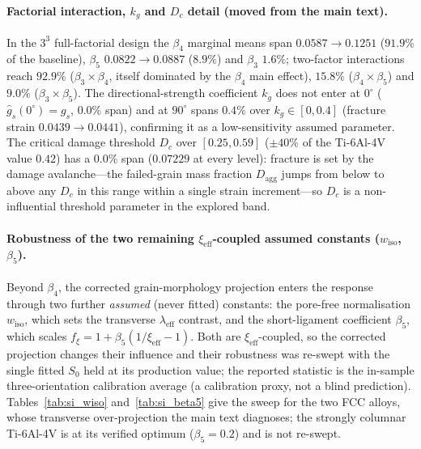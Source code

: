 \documentclass[12pt,a4paper,twocolumn]{article}
\providecommand{\ang}[1]{\ensuremath{#1^{\circ}}}
\begin{document}
\paragraph{Factorial interaction, $k_g$ and $D_c$ detail (moved from the main text).}
In the $3^3$ full-factorial design the $\beta_4$ marginal means span $0.0587\to0.1251$ ($91.9\%$ of the baseline),
$\beta_5$ $0.0822\to0.0887$ ($8.9\%$) and $\beta_3$ $1.6\%$; two-factor interactions reach $92.9\%$
($\beta_3\times\beta_4$, itself dominated by the $\beta_4$ main effect), $15.8\%$ ($\beta_4\times\beta_5$) and $9.0\%$
($\beta_3\times\beta_5$). The directional-strength coefficient $k_g$ does not enter at $\ang{0}$
($\hat g_s(0^\circ)=g_s$, $0.0\%$ span) and at $\ang{90}$ spans $0.4\%$ over $k_g\in[0,0.4]$ (fracture strain
$0.0439\to0.0441$), confirming it as a low-sensitivity assumed parameter. The critical damage threshold $D_c$ over
$[0.25,0.59]$ ($\pm40\%$ of the Ti-6Al-4V value $0.42$) has a $0.0\%$ span ($0.07229$ at every level): fracture is set
by the damage avalanche---the failed-grain mass fraction $D_{\mathrm{agg}}$ jumps from below to above any $D_c$ in this
range within a single strain increment---so $D_c$ is a non-influential threshold parameter in the explored band.

\paragraph{Robustness of the two remaining $\xi_{\mathrm{eff}}$-coupled assumed constants ($w_{\mathrm{iso}}$, $\beta_5$).}
Beyond $\beta_4$, the corrected grain-morphology projection enters the response through two further \emph{assumed} (never fitted) constants: the pore-free normalisation $w_{\mathrm{iso}}$, which sets the transverse $\lambda_{\mathrm{eff}}$ contrast, and the short-ligament coefficient $\beta_5$, which scales $f_\xi = 1 + \beta_5(1/\xi_{\mathrm{eff}} - 1)$. Both are $\xi_{\mathrm{eff}}$-coupled, so the corrected projection changes their influence and their robustness was re-swept with the single fitted $S_0$ held at its production value; the reported statistic is the in-sample three-orientation calibration average (a calibration proxy, not a blind prediction). Tables~\ref{tab:si_wiso} and~\ref{tab:si_beta5} give the sweep for the two FCC alloys, whose transverse over-projection the main text diagnoses; the strongly columnar Ti-6Al-4V is at its verified optimum ($\beta_5 = 0.2$) and is not re-swept.
\end{document}
